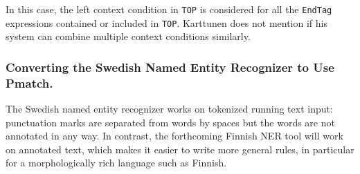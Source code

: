 \documentclass{llncs}
\begin{document}
\noindent
In this case, the left context condition in \texttt{TOP} is considered
for all the \texttt{EndTag} expressions contained or included in
\texttt{TOP}. Karttunen \cite{karttunen/2011} does not mention if his
system can combine multiple context conditions similarly.




\subsubsection{Converting the Swedish Named Entity Recognizer to Use
  Pmatch.}

The Swedish named entity recognizer works on tokenized running text
input: punctuation marks are separated from words by spaces but the
words are not annotated in any way. In contrast, the forthcoming
Finnish NER tool will work on annotated text, which makes it easier to
write more general rules, in particular for a morphologically rich
language such as Finnish.
\end{document}
